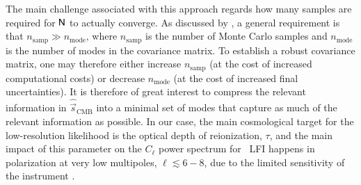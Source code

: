 \documentclass[onecolumn]{aa}
\newcommand{\s}[0]{\vec{s}}
\newcommand{\N}[0]{\tens{N}}
\begin{document}
The main challenge associated with this approach regards how many
samples are required for $\N$ to actually converge. As discussed by
\citet{sellentin2016}, a general requirement is that
$n_{\mathrm{samp}} \gg n_{\mathrm{mode}}$, where $n_{\mathrm{samp}}$
is the number of Monte Carlo samples and $n_{\mathrm{mode}}$ is the
number of modes in the covariance matrix. To establish a robust
covariance matrix, one may therefore either increase
$n_{\mathrm{samp}}$ (at the cost of increased computational costs) or
decrease $n_{\mathrm{mode}}$ (at the cost of increased final
uncertainties). It is therefore of great interest to compress the
relevant information in $\hat{\s}_{\mathrm{CMB}}$ into a minimal set
of modes that capture as much of the relevant information as
possible. In our case, the main cosmological target for the
low-resolution likelihood is the optical depth of reionization,
$\tau$, and the main impact of this parameter on the $C_{\ell}$ power
spectrum for \Planck\ LFI happens in polarization at very low
multipoles, $\ell \lesssim 6-8$, due to the limited sensitivity of the
instrument \citep{planck2016-l05}.
\end{document}
